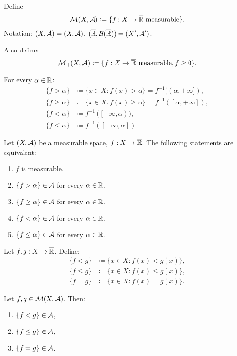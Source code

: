 Define:
\[
\mathcal{M}(X,\mathcal{A}) \mathrel{\mathop:}= \{ f:X \to \overline{\mathbb{R}} \text{ measurable} \}.
\]
Notation: $(X,\mathcal{A}) = (X,\mathcal{A})$, $(\overline{\mathbb{R}}, \mathcal{B}(\overline{\mathbb{R}})) = (X',\mathcal{A}')$.

Also define:
\[
\mathcal{M}_+(X,\mathcal{A}) \mathrel{\mathop:}= \{ f:X \to \overline{\mathbb{R}} \text{ measurable}, f \geq 0 \}.
\]

For every $\alpha \in \mathbb{R}$:
\begin{align*}
\{f > \alpha\} &\coloneqq \{ x \in X : f(x) > \alpha \} = f^{-1}((\alpha, +\infty]), \\
\{f \geq \alpha\} &\coloneqq \{ x \in X : f(x) \geq \alpha \} = f^{-1}([\alpha, +\infty]), \\
\{f < \alpha\} &\coloneqq f^{-1}([-\infty, \alpha)), \\
\{f \leq \alpha\} &\coloneqq f^{-1}([-\infty, \alpha]).
\end{align*}

\begin{theorem}
Let $(X,\mathcal{A})$ be a measurable space, $f:X \to \overline{\mathbb{R}}$.
The following statements are equivalent:
\begin{enumerate}
    \item $f$ is measurable.
    \item $\{f > \alpha\} \in \mathcal{A}$ for every $\alpha \in \mathbb{R}$.
    \item $\{f \geq \alpha\} \in \mathcal{A}$ for every $\alpha \in \mathbb{R}$.
    \item $\{f < \alpha\} \in \mathcal{A}$ for every $\alpha \in \mathbb{R}$.
    \item $\{f \leq \alpha\} \in \mathcal{A}$ for every $\alpha \in \mathbb{R}$.
\end{enumerate}
\end{theorem}

Let $f,g:X \to \overline{\mathbb{R}}$. Define:
\begin{align*}
\{f < g\} &\coloneqq \{ x \in X : f(x) < g(x) \}, \\
\{f \leq g\} &\coloneqq \{ x \in X : f(x) \leq g(x) \}, \\
\{f = g\} &\coloneqq \{ x \in X : f(x) = g(x) \}.
\end{align*}

\begin{theorem}
Let $f,g \in \mathcal{M}(X,\mathcal{A})$. Then:
\begin{enumerate}
    \item $\{f < g\} \in \mathcal{A}$,
    \item $\{f \leq g\} \in \mathcal{A}$,
    \item $\{f = g\} \in \mathcal{A}$.
\end{enumerate}
\end{theorem}

